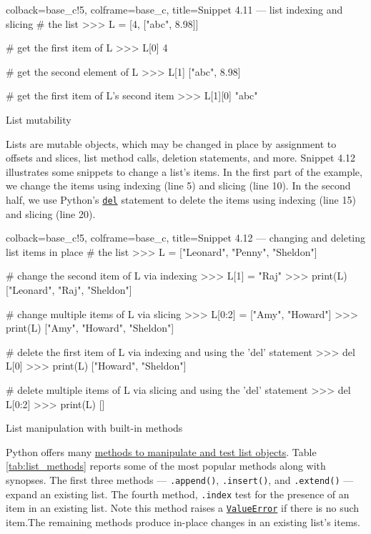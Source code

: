 \documentclass[a4paper,11pt]{book}
\numberwithin{figure}{chapter}
\numberwithin{table}{chapter}
\newcommand{\question}[1]{%
    \begin{tcolorbox}[colback=comp_c!10,colframe=comp_c,sidebyside align=top,width=\linewidth,before skip=1ex]
        #1
    \end{tcolorbox}%
    \switchcolumn%
}
\newcommand{\note}[1]{%
    \begin{tcolorbox}[colback=white!0,colframe=white!10,width=\linewidth,before skip=1ex]
        #1
    \end{tcolorbox}         
}
\begin{document}
\begin{pythoncode}[linenos=true,]{colback=base_c!5, colframe=base_c, title=\sffamily Snippet 4.11 --- list indexing and slicing}
# the list
>>> L = [4, ["abc", 8.98]]

# get the first item of L
>>> L[0]
4

 # get the second element of L
>>> L[1]
["abc", 8.98]

# get the first item of L's second item
>>> L[1][0]
"abc"

\end{pythoncode}

\begin{paracol}{2}
	\question{\raggedright List mutability}
	\note{Lists are mutable objects, which may be changed in place by assignment to offsets and slices, list method calls, deletion statements, and more. Snippet 4.12 illustrates some snippets to change a list's items. In the first part of the example, we change the items using indexing (line 5) and slicing (line 10). In the second half, we use Python's \href{https://docs.python.org/3/reference/simple_stmts.html}{\texttt{del}} statement to delete the items using indexing (line 15) and slicing (line 20).}
\end{paracol}

\begin{pythoncode}[linenos=true,]{colback=base_c!5, colframe=base_c, title=\sffamily Snippet 4.12 --- changing and deleting list items in place}
# the list
>>> L = ["Leonard", "Penny", "Sheldon"]

# change the second item of L via indexing
>>> L[1] = "Raj"
>>> print(L)
["Leonard", "Raj", "Sheldon"]

# change multiple items of L via slicing
>>> L[0:2] = ["Amy", "Howard"]
>>> print(L)
["Amy", "Howard", "Sheldon"]

# delete the first item of L via indexing and using the 'del' statement
>>> del L[0]
>>> print(L)
["Howard", "Sheldon"]

# delete multiple items of L via slicing and using the 'del' statement
>>> del L[0:2]
>>> print(L)
[]

\end{pythoncode}

\begin{paracol}{2}
\question{\raggedright List manipulation with built-in methods}
\note{Python offers many \href{https://docs.python.org/3/tutorial/datastructures.html}{methods to manipulate and test list objects}. Table \ref{tab:list_methods} reports some of the most popular methods along with synopses. The first three methods --- \texttt{.append()}, \texttt{.insert()}, and \texttt{.extend()} --- expand an existing list. The fourth method, \texttt{.index} test for the presence of an item in an existing list. Note this method raises a \href{https://docs.python.org/3/library/exceptions.html#ValueError}{\texttt{ValueError}} if there is no such item.The remaining methods produce in-place changes in an existing list's items.}
\end{paracol}
\end{document}
